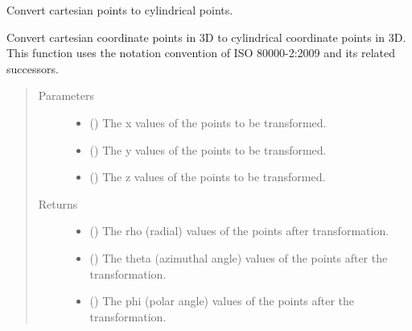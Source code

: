 \documentclass[letterpaper,10pt,english]{sphinxmanual}
\begin{document}
\begin{fulllineitems}
\label{\detokenize{Backend.coordinate_system_transformation:Backend.coordinate_system_transformation.cartesian_to_spherical_3d}}
Convert cartesian points to cylindrical points.

Convert cartesian coordinate points in 3D to cylindrical coordinate points
in 3D. This function uses the notation convention of ISO 80000-2:2009 and
its related successors.
\begin{quote}\begin{description}
\item[{Parameters}] \leavevmode\begin{itemize}
\item {} 
 () \textendash{} The x values of the points to be transformed.

\item {} 
 () \textendash{} The y values of the points to be transformed.

\item {} 
 () \textendash{} The z values of the points to be transformed.

\end{itemize}

\item[{Returns}] \leavevmode
\begin{itemize}
\item {} 
 () \textendash{} The rho (radial) values of the points after transformation.

\item {} 
 () \textendash{} The theta (azimuthal angle) values of the points after the
transformation.

\item {} 
 () \textendash{} The phi (polar angle) values of the points after the transformation.

\end{itemize}


\end{description}\end{quote}

\end{fulllineitems}
\end{document}

